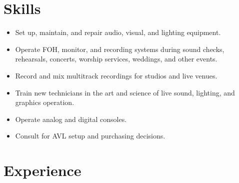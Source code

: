 \documentclass[12pt,sans,colorlinks,linkcolor=true]{moderncv}        %
\begin{document}
\hypersetup{urlcolor=links}
\makecvtitle
\section{Skills}

\begin{itemize}
\item Set up, maintain, and repair audio, visual, and lighting equipment.
\item Operate FOH, monitor, and recording systems during sound checks, rehearsals, concerts, worship services, weddings, and other events.
\item Record and mix multitrack recordings for studios and live venues.
\item Train new technicians in the art and science of live sound, lighting, and graphics operation.
\item Operate analog and digital consoles.
\item Consult for AVL setup and purchasing decisions.
\end{itemize}
\section{Experience}

\end{document}
